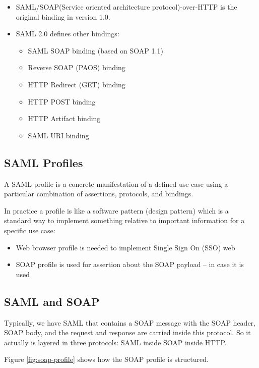 \begin{itemize}
    \item SAML/SOAP(Service oriented architecture protocol)-over-HTTP
      is the original binding in version 1.0.
    \item SAML 2.0 defines other bindings:
    \begin{itemize}
        \item SAML SOAP binding (based on SOAP 1.1)
        \item Reverse SOAP (PAOS) binding
        \item HTTP Redirect (GET) binding
        \item HTTP POST binding
        \item HTTP Artifact binding
        \item SAML URI binding
    \end{itemize}
\end{itemize}

\subsection{SAML Profiles}
A SAML profile is a concrete manifestation of a defined use case using
a particular combination of assertions, protocols, and bindings. 

In practice a profile is like a software pattern (design pattern)
which is a standard way to implement something relative to important
information for a specific use case:
\begin{itemize}
  \item Web browser profile is needed to implement Single Sign On
    (SSO) web
  \item SOAP profile is used for assertion about the SOAP payload – in
    case it is used
\end{itemize}

\subsection{SAML and SOAP}
Typically, we have SAML that contains a SOAP message with the SOAP
header, SOAP body, and the request and response are carried inside
this protocol. So it actually is layered in three protocols: SAML
inside SOAP inside HTTP.

Figure \ref{fig:soap-profile} shows how the SOAP profile is 
structured. 

